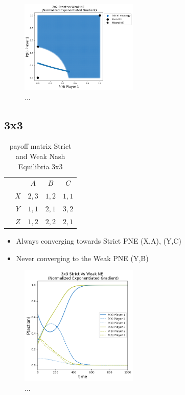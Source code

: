 \begin{figure}
    \centering
    \includegraphics[width=0.5\textwidth]{logos/Weak6.png}
    \caption{...}
    \label{Weak6}
\end{figure}


\subsection{3x3}\label{subsection:3x3}

\begin{table}\centering
\setlength{\extrarowheight}{2pt}
\begin{tabular}{cc|c|c|c|}
  & \multicolumn{1}{c}{} & \multicolumn{1}{c}{$A$}  & \multicolumn{1}{c}{$B$}  & \multicolumn{1}{c}{$C$} \\\cline{3-5}
            & $X$ & $2,3$ & $1,2$ & $1,1$ \\ \cline{3-5}
            & $Y$ & $1,1$ & $2,1$ & $3,2$ \\\cline{3-5}
            & $Z$ & $1,2$ & $2,2$ & $2,1$ \\\cline{3-5}
\end{tabular}\caption{\label{tab:payoffStrictAndWeak3x3}payoff matrix Strict and Weak Nash Equilibria 3x3}
\end{table}

\begin{itemize}
    \item Always converging towards Strict PNE (X,A), (Y,C)
    \item Never converging to the Weak PNE (Y,B)
\end{itemize}

\begin{figure}
    \centering
    \includegraphics[width=0.5\textwidth]{logos/Weak3x3-1.png}
    \caption{...}
    \label{Weak3x3-1}
\end{figure}

